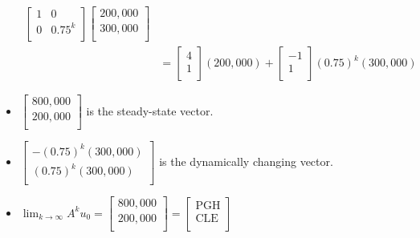 \documentclass{article}
\begin{document}
\begin{itemize}
\begin{align*}
\begin{bmatrix}
            1 & 0\\
            0 & 0.75^k\\
        \end{bmatrix}
        \begin{bmatrix}
            200,000\\
            300,000\\
        \end{bmatrix}\\
        &=
        \begin{bmatrix}
            4\\
            1\\
        \end{bmatrix}
        (200,000) +
        \begin{bmatrix}
            -1\\
            1\\
        \end{bmatrix}
        (0.75)^k(300,000)
    \end{align*}
    \item $
        \begin{bmatrix}
            800,000\\
            200,000\\
        \end{bmatrix}
    $ is the steady-state vector.
    \item $
        \begin{bmatrix}
            -(0.75)^k(300,000)\\
            (0.75)^k(300,000)\\
        \end{bmatrix}
    $ is the dynamically changing vector.
    \item $
        \lim_{k\to\infty} A^ku_0 =
        \begin{bmatrix}
            800,000\\
            200,000\\
        \end{bmatrix}
        =
        \begin{bmatrix}
            \text{PGH}\\
            \text{CLE}\\
        \end{bmatrix}
    $
\end{itemize}
\end{document}
